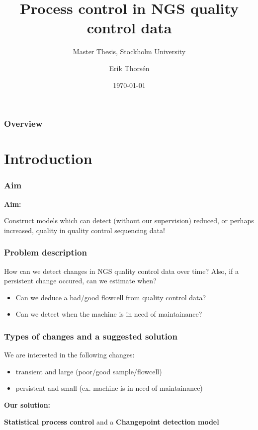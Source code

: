 \documentclass[10pt]{beamer}\usepackage[]{graphicx}\usepackage[]{color}
\begin{document}
\title{Process control in NGS quality control data}  
\subtitle{Master Thesis, Stockholm University}
\author{Erik Thors\'{e}n}
\date{\today} 

\begin{frame}
\titlepage
\end{frame}

\begin{frame}
  \frametitle{Overview}
  \tableofcontents
\end{frame}

\section{Introduction}
\begin{frame}\frametitle{Aim}
\textbf{Aim:}
\begin{center}
Construct models which can detect (without our supervision) reduced, or perhaps increased, quality in quality control sequencing data!
\end{center} 
\end{frame}
\begin{frame}\frametitle{Problem description}

\begin{center}
How can we detect changes in NGS quality control data over time? Also, if a persistent change occured, can we estimate when?
\end{center}

\begin{itemize}
\item Can we deduce a bad/good flowcell from quality control data?
\item Can we detect when the machine is in need of maintainance?
\end{itemize}
\end{frame}


\begin{frame}\frametitle{Types of changes and a suggested solution}
We are interested in the following changes:
\begin{itemize}
\item transient and large (poor/good sample/flowcell)
\item persistent and small (ex. machine is in need of maintainance)
\end{itemize}
\pause

\textbf{Our solution:}
\begin{center}
\textbf{Statistical process control} and a \textbf{Changepoint detection model} 
\end{center}
\end{frame}
\end{document}

